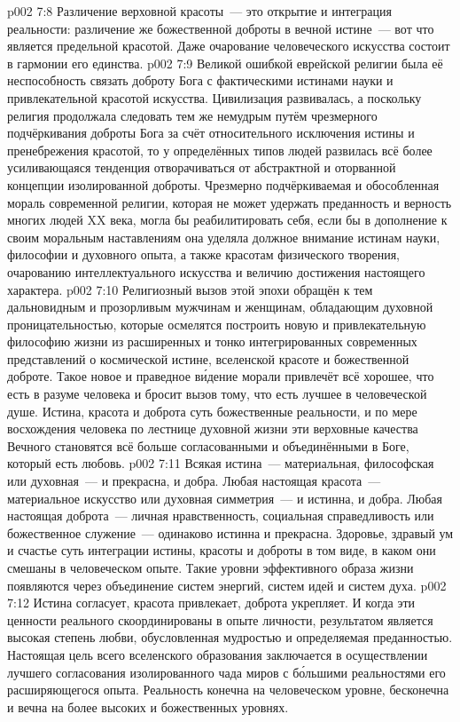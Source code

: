 \vs p002 7:8 \pc Различение верховной красоты~--- это открытие и интеграция реальности: различение же божественной доброты в вечной истине~--- вот что является предельной красотой. Даже очарование человеческого искусства состоит в гармонии его единства.
\vs p002 7:9 Великой ошибкой еврейской религии была её неспособность связать доброту Бога с фактическими истинами науки и привлекательной красотой искусства. Цивилизация развивалась, а поскольку религия продолжала следовать тем же немудрым путём чрезмерного подчёркивания доброты Бога за счёт относительного исключения истины и пренебрежения красотой, то у определённых типов людей развилась всё более усиливающаяся тенденция отворачиваться от абстрактной и оторванной концепции изолированной доброты. Чрезмерно подчёркиваемая и обособленная мораль современной религии, которая не может удержать преданность и верность многих людей XX века, могла бы реабилитировать себя, если бы в дополнение к своим моральным наставлениям она уделяла должное внимание истинам науки, философии и духовного опыта, а также красотам физического творения, очарованию интеллектуального искусства и величию достижения настоящего характера.
\vs p002 7:10 Религиозный вызов этой эпохи обращён к тем дальновидным и прозорливым мужчинам и женщинам, обладающим духовной проницательностью, которые осмелятся построить новую и привлекательную философию жизни из расширенных и тонко интегрированных современных представлений о космической истине, вселенской красоте и божественной доброте. Такое новое и праведное в\'идение морали привлечёт всё хорошее, что есть в разуме человека и бросит вызов тому, что есть лучшее в человеческой душе. Истина, красота и доброта суть божественные реальности, и по мере восхождения человека по лестнице духовной жизни эти верховные качества Вечного становятся всё больше согласованными и объединёнными в Боге, который есть любовь.
\vs p002 7:11 \pc Всякая истина~--- материальная, философская или духовная~--- и прекрасна, и добра. Любая настоящая красота~--- материальное искусство или духовная симметрия~--- и истинна, и добра. Любая настоящая доброта~--- личная нравственность, социальная справедливость или божественное служение~--- одинаково истинна и прекрасна. Здоровье, здравый ум и счастье суть интеграции истины, красоты и доброты в том виде, в каком они смешаны в человеческом опыте. Такие уровни эффективного образа жизни появляются через объединение систем энергий, систем идей и систем духа.
\vs p002 7:12 Истина согласует, красота привлекает, доброта укрепляет. И когда эти ценности реального скоординированы в опыте личности, результатом является высокая степень любви, обусловленная мудростью и определяемая преданностью. Настоящая цель всего вселенского образования заключается в осуществлении лучшего согласования изолированного чада миров с б\'ольшими реальностями его расширяющегося опыта. Реальность конечна на человеческом уровне, бесконечна и вечна на более высоких и божественных уровнях.
